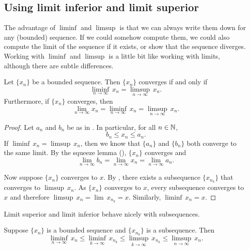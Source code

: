 \subsection{Using limit inferior and limit superior}

The advantage of $\liminf$ and $\limsup$ is that we can always write them
down for any (bounded) sequence.
If we could somehow compute them, we could also compute the limit of the
sequence if it exists, or show that the sequence diverges.
Working with $\liminf$ and $\limsup$ is a
little bit like working with limits, although there are subtle differences.

\begin{prop} \label{liminfsupconv:prop}
Let $\{ x_n \}$ be a bounded sequence.  Then $\{ x_n \}$ converges
if and only if
\begin{equation*}
\liminf_{n\to \infty} \, x_n = 
\limsup_{n\to \infty} \, x_n.
\end{equation*}
Furthermore, if $\{ x_n \}$ converges, then
\begin{equation*}
\lim_{n\to \infty} x_n = 
\liminf_{n\to \infty} \, x_n = 
\limsup_{n\to \infty} \, x_n.
\end{equation*}
\end{prop}

\begin{proof}
Let $a_n$ and $b_n$ be as in .
In particular, for all $n \in {\mathbb{N}}$,
\begin{equation*}
b_n \leq x_n \leq a_n .
\end{equation*}
If 
$\liminf \, x_n = \limsup \, x_n$, then we know that $\{ a_n \}$ and $\{ b_n \}$
both converge to the same limit.
By the squeeze lemma
(), $\{ x_n \}$ converges and
\begin{equation*}
\lim_{n\to \infty} b_n
=
\lim_{n\to \infty} x_n
=
\lim_{n\to \infty} a_n .
\end{equation*}

Now suppose $\{ x_n \}$ converges to $x$.
By ,
there exists a subsequence $\{ x_{n_k} \}$
that converges to $\limsup \, x_n$.
As $\{ x_n \}$ converges to $x$,
every subsequence converges to $x$ and
therefore $\limsup \, x_n = \lim\, x_{n_k} = x$.  Similarly, $\liminf \, x_n = x$.
\end{proof}

Limit superior and limit inferior behave nicely
with subsequences.

\begin{prop} \label{prop:subseqslimsupinf}
Suppose $\{ x_n \}$ is a bounded sequence and
$\{ x_{n_k} \}$ is a subsequence.  Then
\begin{equation*}
\liminf_{n\to\infty} \, x_n \leq
\liminf_{k\to\infty} \, x_{n_k} \leq
\limsup_{k\to\infty} \, x_{n_k} \leq
\limsup_{n\to\infty} \, x_n .
\end{equation*}
\end{prop}

